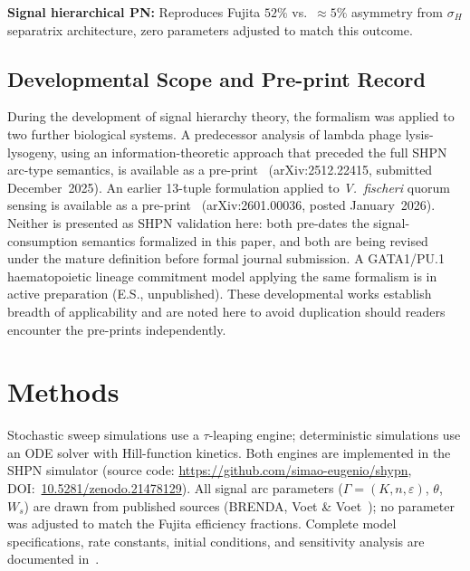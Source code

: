 \documentclass[10pt,letterpaper]{article}
\begin{document}
\textbf{Signal hierarchical PN:} Reproduces Fujita $52\%$ vs.\ $\approx 5\%$ asymmetry from $\sigma_H$ separatrix architecture, zero parameters adjusted to match this outcome.

\subsection{Developmental Scope and Pre-print Record}
\label{sec:broader}

During the development of signal hierarchy theory, the formalism was applied to
two further biological systems. A predecessor analysis of lambda phage
lysis-lysogeny, using an information-theoretic approach that preceded the full
SHPN arc-type semantics, is available as a pre-print~\cite{simao2024hierarchical}
(arXiv:2512.22415, submitted December~2025). An earlier 13-tuple formulation
applied to \textit{V.\ fischeri} quorum sensing is available as a
pre-print~\cite{simao2025unifying} (arXiv:2601.00036, posted January~2026).
Neither is presented as SHPN validation here: both pre-dates the
signal-consumption semantics formalized in this paper, and both are being revised
under the mature definition before formal journal submission. A GATA1/PU.1
haematopoietic lineage commitment model applying the same formalism is in active
preparation (E.S., unpublished). These developmental works establish breadth of
applicability and are noted here to avoid duplication should readers encounter
the pre-prints independently.



\section{Methods}
\label{sec:methods}

Stochastic sweep simulations use a $\tau$-leaping engine; deterministic simulations use an ODE solver with Hill-function kinetics. Both engines are implemented in the SHPN simulator (source code: \url{https://github.com/simao-eugenio/shypn}, DOI:~\href{https://doi.org/10.5281/zenodo.21478129}{10.5281/zenodo.21478129}). All signal arc parameters ($\Gamma = (K, n, \varepsilon)$, $\theta$, $W_s$) are drawn from published sources (BRENDA, Voet \& Voet~\cite{voet2016}); no parameter was adjusted to match the Fujita efficiency fractions. Complete model specifications, rate constants, initial conditions, and sensitivity analysis are documented in~\cite{subtilis2026}.
\end{document}
